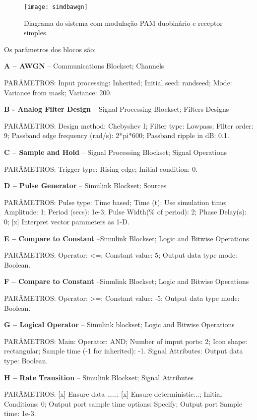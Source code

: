 \begin{figure}[H]
  \centering
  \caption{Diagrama do sistema com modulação PAM duobinário e receptor simples.}
  \texttt{[image: simdbawgn]}
  \label{fig:simdbawgn}
\end{figure}

Os parâmetros dos blocos são:

\textbf{A – AWGN} – Communications Blockset; Channels 

PARÂMETROS: Input processing: Inherited; Initial seed: randseed; Mode: Variance from mask; Variance: 200.

\textbf{B - Analog Filter Design} – Signal Processing Blockset; Filters Designs

PARÂMETROS: Design method: Chebyshev I; Filter type: Lowpass; Filter order: 9;
Passband edge frequency (rad/s): 2*pi*600; Passband ripple in dB: 0.1.

\textbf{C – Sample and Hold} – Signal Processing Blockset; Signal Operations

PARÂMETROS: Trigger type: Rising edge; Initial condition: 0.

\textbf{D – Pulse Generator} – Simulink Blockset; Sources

PARÂMETROS: Pulse type: Time based; Time (t): Use simulation time; Amplitude: 1; Period (secs): 1e-3; Pulse Width(\% of period): 2; Phase Delay(s): 0; [x] Interpret vector parameters as 1-D.

\textbf{E – Compare to Constant} –Simulink Blockset; Logic and Bitwise Operations

PARÂMETROS: Operator: <=; Constant value: 5; Output data type mode: Boolean.

\textbf{F – Compare to Constant} –Simulink Blockset; Logic and Bitwise Operations

PARÂMETROS: Operator: >=; Constant value: -5; Output data type mode: Boolean.

\textbf{G – Logical Operator} – Simulink blockset; Logic and Bitwise Operations

PARÂMETROS: Main: Operator: AND; Number of imput ports: 2; Icon shape: rectangular; Sample time (-1 for inherited): -1. Signal Attributes: Output data type: Boolean.

\textbf{H – Rate Transition} – Simulink Blockset; Signal Attributes

PARÂMETROS: [x] Ensure data .....; [x] Ensure deterministic...; Initial Conditions: 0; Output port sample time options: Specify; Output port Sample time: 1e-3.

